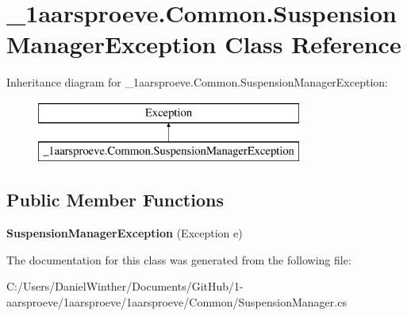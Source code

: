 \hypertarget{class__1aarsproeve_1_1_common_1_1_suspension_manager_exception}{}\section{\+\_\+1aarsproeve.\+Common.\+Suspension\+Manager\+Exception Class Reference}
\label{class__1aarsproeve_1_1_common_1_1_suspension_manager_exception}
Inheritance diagram for \+\_\+1aarsproeve.\+Common.\+Suspension\+Manager\+Exception\+:\begin{figure}[H]
\begin{center}
\leavevmode
\includegraphics[height=2.000000cm]{class__1aarsproeve_1_1_common_1_1_suspension_manager_exception}
\end{center}
\end{figure}
\subsection*{Public Member Functions}
\begin{DoxyCompactItemize}
\item 
\hypertarget{class__1aarsproeve_1_1_common_1_1_suspension_manager_exception_a7beaead1dc1988f760ae8913a5b2b4c8}{}{\bfseries Suspension\+Manager\+Exception} (Exception e)\label{class__1aarsproeve_1_1_common_1_1_suspension_manager_exception_a7beaead1dc1988f760ae8913a5b2b4c8}

\end{DoxyCompactItemize}


The documentation for this class was generated from the following file\+:\begin{DoxyCompactItemize}
\item 
C\+:/\+Users/\+Daniel\+Winther/\+Documents/\+Git\+Hub/1-\/aarsproeve/1aarsproeve/1aarsproeve/\+Common/Suspension\+Manager.\+cs\end{DoxyCompactItemize}
